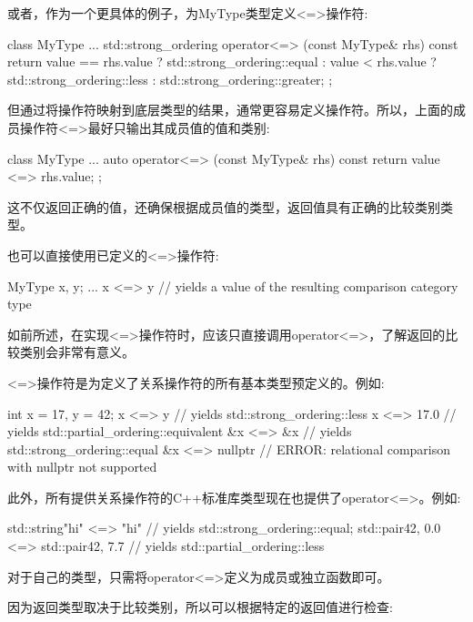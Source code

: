 或者，作为一个更具体的例子，为MyType类型定义<=>操作符:

\begin{cpp}
class MyType {
	...
	std::strong_ordering operator<=> (const MyType& rhs) const {
		return value == rhs.value ? std::strong_ordering::equal :
			   value < rhs.value ? std::strong_ordering::less :
							       std::strong_ordering::greater;
	}
};
\end{cpp}

但通过将操作符映射到底层类型的结果，通常更容易定义操作符。所以，上面的成员操作符<=>最好只输出其成员值的值和类别:

\begin{cpp}
class MyType {
	...
	auto operator<=> (const MyType& rhs) const {
		return value <=> rhs.value;
	}
};
\end{cpp}

这不仅返回正确的值，还确保根据成员值的类型，返回值具有正确的比较类别类型。


也可以直接使用已定义的<=>操作符:

\begin{cpp}
MyType x, y;
...
x <=> y // yields a value of the resulting comparison category type
\end{cpp}

如前所述，在实现<=>操作符时，应该只直接调用operator<=>，了解返回的比较类别会非常有意义。

<=>操作符是为定义了关系操作符的所有基本类型预定义的。例如:

\begin{cpp}
int x = 17, y = 42;
x <=> y // yields std::strong_ordering::less
x <=> 17.0 // yields std::partial_ordering::equivalent
&x <=> &x // yields std::strong_ordering::equal
&x <=> nullptr // ERROR: relational comparison with nullptr not supported
\end{cpp}

此外，所有提供关系操作符的C++标准库类型现在也提供了operator<=>。例如:

\begin{cpp}
std::string{"hi"} <=> "hi" // yields std::strong_ordering::equal;
std::pair{42, 0.0} <=> std::pair{42, 7.7} // yields std::partial_ordering::less
\end{cpp}

对于自己的类型，只需将operator<=>定义为成员或独立函数即可。

因为返回类型取决于比较类别，所以可以根据特定的返回值进行检查:

